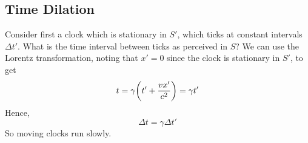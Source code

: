 \subsection{Time Dilation}
Consider first a clock which is stationary in \(S'\), which ticks at constant intervals \(\Delta t'\). What is the time interval between ticks as perceived in \(S\)? We can use the Lorentz transformation, noting that \(x'=0\) since the clock is stationary in \(S'\), to get
\[ t = \gamma\qty(t' + \frac{vx'}{c^2}) = \gamma t' \]
Hence,
\[ \Delta t = \gamma \Delta t' \]
So moving clocks run slowly.
